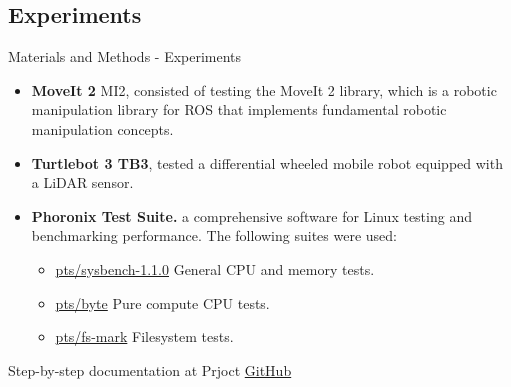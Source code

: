 \documentclass[aspectratio=169]{beamer}
\begin{document}
\subsection{Experiments}
\begin{frame}{Materials and Methods - Experiments}

    \begin{itemize}
        \item  \textbf{MoveIt 2} MI2, consisted of testing the MoveIt 2 library, which is a robotic manipulation library for ROS that implements fundamental robotic manipulation concepts. 
        \item \textbf{Turtlebot 3 TB3}, tested a differential wheeled mobile robot equipped with a LiDAR sensor.
        \item \textbf{Phoronix Test Suite.} a comprehensive software for Linux testing and benchmarking performance. The following suites were used: 
             \begin{itemize}        
                \item \href{https://openbenchmarking.org/test/pts/sysbench}{pts/sysbench-1.1.0} General CPU and memory tests.    
                \item \href{https://openbenchmarking.org/test/pts/byte}{pts/byte} Pure compute CPU tests.
                \item \href{https://openbenchmarking.org/test/pts/fs-mark}{pts/fs-mark}  Filesystem tests.      
            \end{itemize}     
    
    \end{itemize} 

\footnotesize{Step-by-step documentation at Prjoct \href{https://github.com/b0rh/HOUSE/tree/master/0.TLB/ROS2_foxy-robofuzz\#benchmark}{GitHub}}
\end{frame}
\end{document}
